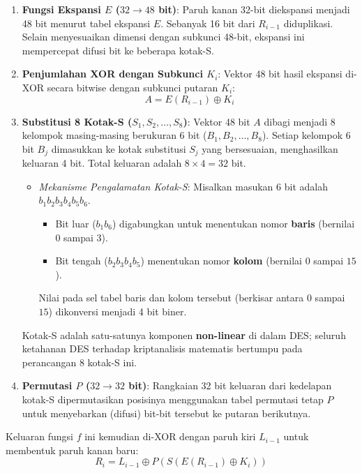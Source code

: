 \begin{enumerate}
  \item \textbf{Fungsi Ekspansi $E$ ($32 \to 48$ bit)}:
  Paruh kanan 32-bit diekspansi menjadi 48 bit menurut tabel ekspansi $E$. Sebanyak 16 bit dari $R_{i-1}$ diduplikasi. Selain menyesuaikan dimensi dengan subkunci 48-bit, ekspansi ini mempercepat difusi bit ke beberapa kotak-S.

  \item \textbf{Penjumlahan XOR dengan Subkunci $K_i$}:
  Vektor 48 bit hasil ekspansi di-XOR secara bitwise dengan subkunci putaran $K_i$:
  \begin{equation}
    A = E(R_{i-1}) \oplus K_i
  \end{equation}

  \item \textbf{Substitusi 8 Kotak-S ($S_1, S_2, \dots, S_8$)}:
  Vektor 48 bit $A$ dibagi menjadi 8 kelompok masing-masing berukuran 6 bit ($B_1, B_2, \dots, B_8$). Setiap kelompok 6 bit $B_j$ dimasukkan ke kotak substitusi $S_j$ yang bersesuaian, menghasilkan keluaran 4 bit. Total keluaran adalah $8 \times 4 = 32$ bit.
  \begin{itemize}
    \item \textit{Mekanisme Pengalamatan Kotak-S}:
    Misalkan masukan 6 bit adalah $b_1 b_2 b_3 b_4 b_5 b_6$.
    \begin{itemize}
      \item Bit luar ($b_1 b_6$) digabungkan untuk menentukan nomor \textbf{baris} (bernilai $0$ sampai $3$).
      \item Bit tengah ($b_2 b_3 b_4 b_5$) menentukan nomor \textbf{kolom} (bernilai $0$ sampai $15$).
    \end{itemize}
    Nilai pada sel tabel baris dan kolom tersebut (berkisar antara $0$ sampai $15$) dikonversi menjadi 4 bit biner.
  \end{itemize}
  Kotak-S adalah satu-satunya komponen \textbf{non-linear} di dalam DES; seluruh ketahanan DES terhadap kriptanalisis matematis bertumpu pada perancangan 8 kotak-S ini.

  \item \textbf{Permutasi $P$ ($32 \to 32$ bit)}:
  Rangkaian 32 bit keluaran dari kedelapan kotak-S dipermutasikan posisinya menggunakan tabel permutasi tetap $P$ untuk menyebarkan (difusi) bit-bit tersebut ke putaran berikutnya.
\end{enumerate}

Keluaran fungsi $f$ ini kemudian di-XOR dengan paruh kiri $L_{i-1}$ untuk membentuk paruh kanan baru:
\begin{equation}
  R_i = L_{i-1} \oplus P(S(E(R_{i-1}) \oplus K_i))
\end{equation}

